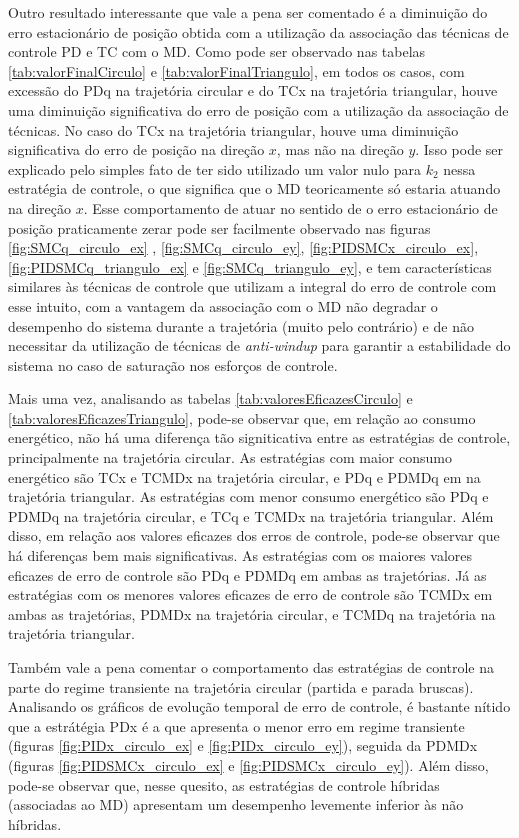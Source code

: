 \documentclass[]{politex}
\begin{document}
Outro resultado interessante que vale a pena ser comentado é a diminuição do erro estacionário de posição obtida com a utilização da associação das técnicas de controle PD e TC com o MD. Como pode ser observado nas tabelas \ref{tab:valorFinalCirculo} e \ref{tab:valorFinalTriangulo}, em todos os casos, com excessão do PDq na trajetória circular e do TCx na trajetória triangular, houve uma diminuição significativa do erro de posição com a utilização da associação de técnicas. No caso do TCx na trajetória triangular, houve uma diminuição significativa do erro de posição na direção $x$, mas não na direção $y$. Isso pode ser explicado pelo simples fato de ter sido utilizado um valor nulo para $k_2$ nessa estratégia de controle, o que significa que o MD teoricamente só estaria atuando na direção $x$. Esse comportamento de atuar no sentido de o erro estacionário de posição praticamente zerar pode ser facilmente observado nas figuras \ref{fig:SMCq_circulo_ex} , \ref{fig:SMCq_circulo_ey}, \ref{fig:PIDSMCx_circulo_ex}, \ref{fig:PIDSMCq_triangulo_ex} e \ref{fig:SMCq_triangulo_ey}, e tem características similares às técnicas de controle que utilizam a integral do erro de controle com esse intuito, com a vantagem da associação com o MD não degradar o desempenho do sistema durante a trajetória (muito pelo contrário) e de não necessitar da utilização de técnicas de \emph{anti-windup} para garantir a estabilidade do sistema no caso de saturação nos esforços de controle.

Mais uma vez, analisando as tabelas \ref{tab:valoresEficazesCirculo} e \ref{tab:valoresEficazesTriangulo}, pode-se observar que, em relação ao consumo energético, não há uma diferença tão signiticativa entre as estratégias de controle, principalmente na trajetória circular. As estratégias com maior consumo energético são TCx e TCMDx na trajetória circular, e PDq e PDMDq em na trajetória triangular. As estratégias com menor consumo energético são PDq e PDMDq na trajetória circular, e TCq e TCMDx na trajetória triangular. Além disso, em relação aos valores eficazes dos erros de controle, pode-se observar que há diferenças bem mais significativas. As estratégias com os maiores valores eficazes de erro de controle são PDq e PDMDq em ambas as trajetórias. Já as estratégias com os menores valores eficazes de erro de controle são TCMDx em ambas as trajetórias, PDMDx na trajetória circular, e TCMDq na trajetória na trajetória triangular.

Também vale a pena comentar o comportamento das estratégias de controle na parte do regime transiente na trajetória circular (partida e parada bruscas). Analisando os gráficos de evolução temporal de erro de controle, é bastante nítido que a estrátégia PDx é a que apresenta o menor erro em regime transiente (figuras \ref{fig:PIDx_circulo_ex} e \ref{fig:PIDx_circulo_ey}), seguida da PDMDx (figuras \ref{fig:PIDSMCx_circulo_ex} e \ref{fig:PIDSMCx_circulo_ey}). Além disso, pode-se observar que, nesse quesito, as estratégias de controle híbridas (associadas ao MD) apresentam um desempenho levemente inferior às não híbridas.
\end{document}
